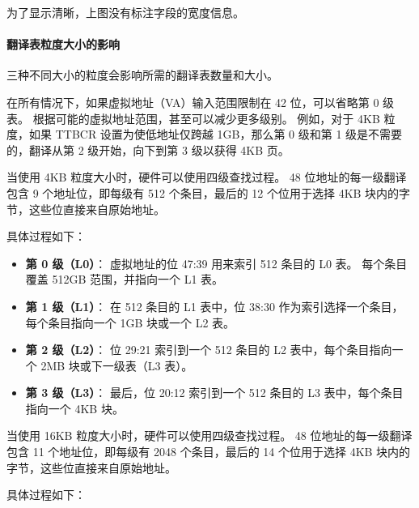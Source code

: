 
\begin{Tcbox}[title={Note}]
  为了显示清晰，上图没有标注字段的宽度信息。
\end{Tcbox}

\paragraph{翻译表粒度大小的影响}

三种不同大小的粒度会影响所需的翻译表数量和大小。

\begin{Tcbox}[title={Note}]
在所有情况下，如果虚拟地址（VA）输入范围限制在 42 位，可以省略第 0 级表。
根据可能的虚拟地址范围，甚至可以减少更多级别。
例如，对于 4KB 粒度，如果 TTBCR 设置为使低地址仅跨越 1GB，那么第 0 级和第 1 级是不需要的，翻译从第 2 级开始，向下到第 3 级以获得 4KB 页。
\end{Tcbox}

当使用 4KB 粒度大小时，硬件可以使用四级查找过程。
48 位地址的每一级翻译包含 9 个地址位，即每级有 512 个条目，最后的 12 个位用于选择 4KB 块内的字节，这些位直接来自原始地址。

具体过程如下：

\begin{itemize}
  \item
  \textbf{第 0 级（L0）}：
    虚拟地址的位 47:39 用来索引 512 条目的 L0 表。
    每个条目覆盖 512GB 范围，并指向一个 L1 表。
  \item
  \textbf{第 1 级（L1）}：
    在 512 条目的 L1 表中，位 38:30 作为索引选择一个条目，每个条目指向一个 1GB 块或一个 L2 表。
  \item
  \textbf{第 2 级（L2）}：
    位 29:21 索引到一个 512 条目的 L2 表中，每个条目指向一个 2MB 块或下一级表（L3 表）。
  \item
  \textbf{第 3 级（L3）}：
    最后，位 20:12 索引到一个 512 条目的 L3 表中，每个条目指向一个 4KB 块。
\end{itemize}



当使用 16KB 粒度大小时，硬件可以使用四级查找过程。
48 位地址的每一级翻译包含 11 个地址位，即每级有 2048 个条目，最后的 14 个位用于选择 4KB 块内的字节，这些位直接来自原始地址。

具体过程如下：

